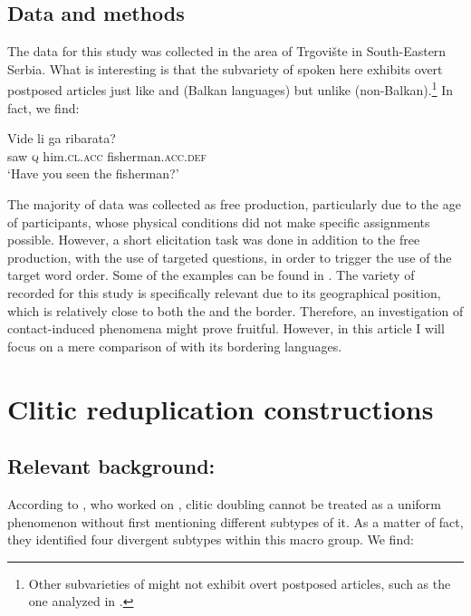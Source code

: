 \documentclass[output=paper,
colorlinks,
citecolor=brown,
newtxmath
]{langscibook}
\begin{document}
\subsection{Data and methods}
\label{sec:dataandmethods}
The data for this study was collected in the area of Trgovište in South-Eastern Serbia. What is interesting is that the subvariety of  spoken here exhibits overt postposed articles just like  and  (Balkan languages) but unlike  (non-Balkan).\footnote{Other subvarieties of  might not exhibit overt postposed articles, such as the one analyzed in \citet{Runic2013,Runic2014}.} In fact, we find:


\ea\label{ex:zivojinovic:5}
\gll Vide li  ga         ribarata?\\
     saw  \textsc{q}   him.\textsc{cl.acc} fisherman.\textsc{acc.def}\\
\glt `Have you seen the fisherman?'
\z

\noindent The majority of data was collected as free production, particularly due to the age of participants, whose physical conditions did not make specific assignments possible. However, a short elicitation task was done in addition to the free production, with the use of targeted questions, in order to trigger the use of the target word order. Some of the examples can be found in . The variety of  recorded for this study is specifically relevant due to its geographical position, which is relatively close to both the  and the  border. Therefore, an investigation of contact-induced phenomena might prove fruitful. However, in this article I will focus on a mere comparison of  with its bordering languages.
%
%

    \largerpage[-2]

\section{Clitic reduplication constructions}
\label{sec:reduplications}

\subsection{Relevant background: \citet{Cinque.Krapova2008}}
\label{subsec:relevantbackground}
According to \citet{Cinque.Krapova2008}, who worked on , clitic doubling cannot be treated as a uniform phenomenon without first mentioning different subtypes of it. As a matter of fact, they identified four divergent subtypes within this macro group. We find:
\end{document}
